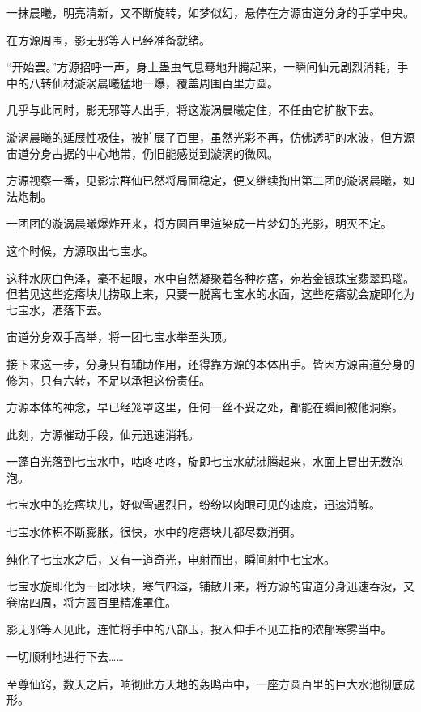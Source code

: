 
\begin{this_body}



一抹晨曦，明亮清新，又不断旋转，如梦似幻，悬停在方源宙道分身的手掌中央。

在方源周围，影无邪等人已经准备就绪。

“开始罢。”方源招呼一声，身上蛊虫气息蓦地升腾起来，一瞬间仙元剧烈消耗，手中的八转仙材漩涡晨曦猛地一爆，覆盖周围百里方圆。

几乎与此同时，影无邪等人出手，将这漩涡晨曦定住，不任由它扩散下去。

漩涡晨曦的延展性极佳，被扩展了百里，虽然光彩不再，仿佛透明的水波，但方源宙道分身占据的中心地带，仍旧能感觉到漩涡的微风。

方源视察一番，见影宗群仙已然将局面稳定，便又继续掏出第二团的漩涡晨曦，如法炮制。

一团团的漩涡晨曦爆炸开来，将方圆百里渲染成一片梦幻的光影，明灭不定。

这个时候，方源取出七宝水。

这种水灰白色泽，毫不起眼，水中自然凝聚着各种疙瘩，宛若金银珠宝翡翠玛瑙。但若见这些疙瘩块儿捞取上来，只要一脱离七宝水的水面，这些疙瘩就会旋即化为七宝水，洒落下去。

宙道分身双手高举，将一团七宝水举至头顶。

接下来这一步，分身只有辅助作用，还得靠方源的本体出手。皆因方源宙道分身的修为，只有六转，不足以承担这份责任。

方源本体的神念，早已经笼罩这里，任何一丝不妥之处，都能在瞬间被他洞察。

此刻，方源催动手段，仙元迅速消耗。

一蓬白光落到七宝水中，咕咚咕咚，旋即七宝水就沸腾起来，水面上冒出无数泡泡。

七宝水中的疙瘩块儿，好似雪遇烈日，纷纷以肉眼可见的速度，迅速消解。

七宝水体积不断膨胀，很快，水中的疙瘩块儿都尽数消弭。

纯化了七宝水之后，又有一道奇光，电射而出，瞬间射中七宝水。

七宝水旋即化为一团冰块，寒气四溢，铺散开来，将方源的宙道分身迅速吞没，又卷席四周，将方圆百里精准罩住。

影无邪等人见此，连忙将手中的八部玉，投入伸手不见五指的浓郁寒雾当中。

一切顺利地进行下去……

至尊仙窍，数天之后，响彻此方天地的轰鸣声中，一座方圆百里的巨大水池彻底成形。


\end{this_body}
